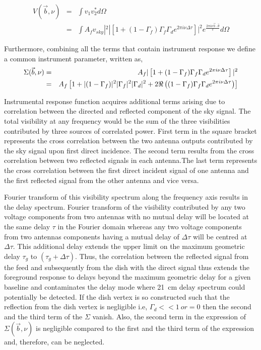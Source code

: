 \documentclass[12pt,preprint]{aastex}
\newcommand{\volt}{{v}}
\newcommand{\vis}{{V}}
\newcommand{\bm}{{A}}
\newcommand{\thhat}{{\hat\theta}}
\newcommand{\fngexp}{{e^{\frac{2\pi i\nu\vec{b}\cdot\thhat}{c}}}}
\newcommand{\dfngexp}{{e^{2\pi i\nu \Delta \tau}}}
\begin{document}
\begin{eqnarray}
\vis(\vec b, \nu) & = & \int \volt_{1}\volt_{2}^{*} d\Omega \nonumber\\
		        & = & \int \bm_{f} \volt_{sky}|^{2} |\left [ 1+(1-\Gamma_{f}) \Gamma_{f} \Gamma_{d} \dfngexp  \right]|^{2} \fngexp  d\Omega
\label{eq6}		        
\end{eqnarray}


 Furthermore, combining all the terms that contain instrument response we define a common instrument parameter, written as, 
\begin{eqnarray}
\Sigma(\vec b, \nu) & = & \bm_{f} |\left [ 1+ (1-\Gamma_{f}) \Gamma_{f} \Gamma_{d} e^{2\pi i\nu \Delta \tau} \right]|^{2}\nonumber\\
 	    & = &  \bm_{f}  \left[ 1+ |(1-\Gamma_{f})|^{2}|\Gamma_{f}|^{2}|\Gamma_{d}|^{2} + 2 \Re \left ( (1-\Gamma_{f})\Gamma_{f}\Gamma_{d} \dfngexp \right) \right] 
\label{eq{7}}	    
\end{eqnarray} 

Instrumental response function acquires additional terms arising due to correlation between the directed and reflected component of the sky signal. The total visibility at any frequency would be the sum of the three visibilities contributed by three sources of correlated power. First term in the square bracket represents the cross correlation between the two antenna outputs contributed by the sky signal upon first direct incidence. The second term results from the cross correlation between two reflected signals in each antenna.The last term represents the cross correlation between the first direct incident signal of one antenna and the first reflected signal from the other antenna and vice versa.

Fourier transform of this visibility spectrum along the frequency axis results in the delay spectrum. 
 Fourier transform of the visibility contributed by any two voltage components from two antennas with no mutual delay will be located at the same delay $\tau $ in the Fourier domain whereas any two voltage components from two antennas components having a mutual delay of $\Delta \tau$ will be centred at $\Delta \tau$. This additional delay extends the upper limit on the maximum geometric delay $\tau_{g}$ to $(\tau_{g}+\Delta \tau)$.
 Thus, the correlation between the reflected signal  from the feed and subsequently from the dish with the direct signal thus extends the foreground response to delays beyond the maximum geometric delay for a given baseline and contaminates the delay mode where 21~cm delay spectrum could potentially be detected. 
 If the dish vertex is so constructed such that the reflection from the dish vertex is negligible i.e, $\Gamma_{d}<<1\ or = 0$ then the second and the third term of the $\Sigma$ vanish. Also, the second term in the expression of $\Sigma(\vec b, \nu)$ is negligible compared to the first and the third term of the expression and, therefore, can be neglected. \\
\end{document}
